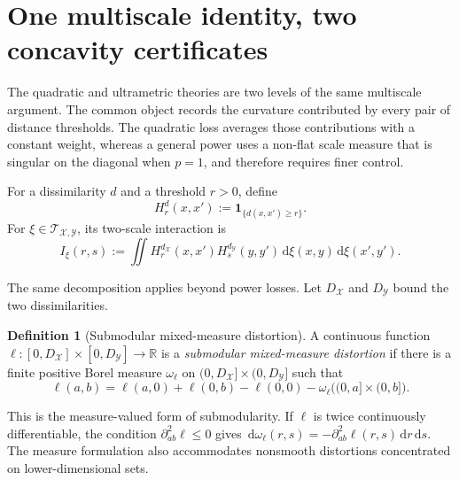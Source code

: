 \documentclass[11pt,a4paper]{article}
\theoremstyle{definition}
\newtheorem{definition}[theorem]{Definition}
\theoremstyle{remark}
\newcommand{\R}{\mathbb R}
\newcommand{\Tcal}{\mathcal T}
\newcommand{\dd}{\,\mathrm d}
\begin{document}
\section{One multiscale identity, two concavity certificates}
\label{sec:master-decomposition}

The quadratic and ultrametric theories are two levels of the same multiscale
argument.  The common object records the curvature contributed by every pair
of distance thresholds.  The quadratic loss averages those contributions
with a constant weight, whereas a general power uses a non-flat scale measure
that is singular on the diagonal when \(p=1\), and therefore requires finer
control.

For a dissimilarity \(d\) and a threshold \(r>0\), define
\begin{equation}
  H_r^d(x,x'):=\mathbf 1_{\{d(x,x')\geq r\}}.
  \label{eq:threshold-kernel}
\end{equation}
For \(\xi\in\Tcal_{\mathcal X,\mathcal Y}\), its two-scale interaction is
\begin{equation}
  I_\xi(r,s)
  :=\iint
  H_r^{d_{\mathcal X}}(x,x')H_s^{d_{\mathcal Y}}(y,y')
  \dd\xi(x,y)\dd\xi(x',y').
  \label{eq:threshold-product}
\end{equation}

The same decomposition applies beyond power losses.  Let
\(D_{\mathcal X}\) and \(D_{\mathcal Y}\) bound the two dissimilarities.

\begin{definition}[Submodular mixed-measure distortion]
\label{def:mixed-measure-distortion}
A continuous function
\(\ell:[0,D_{\mathcal X}]\times[0,D_{\mathcal Y}]\to\R\) is a
\emph{submodular mixed-measure distortion} if there is a finite positive Borel
measure \(\omega_\ell\) on
\((0,D_{\mathcal X}]\times(0,D_{\mathcal Y}]\) such that
\begin{equation}
  \ell(a,b)
  =\ell(a,0)+\ell(0,b)-\ell(0,0)
  -\omega_\ell\bigl((0,a]\times(0,b]\bigr).
  \label{eq:mixed-measure-representation}
\end{equation}
\end{definition}

This is the measure-valued form of submodularity.  If \(\ell\) is twice
continuously differentiable, the condition
\(\partial_{ab}^2\ell\leq0\) gives
\(\dd\omega_\ell(r,s)=-\partial_{ab}^2\ell(r,s)\dd r\dd s\).
The measure formulation also accommodates nonsmooth distortions concentrated
on lower-dimensional sets.
\end{document}
